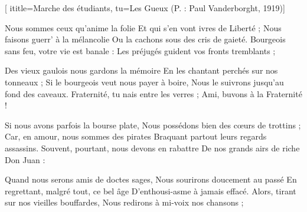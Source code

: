 [
  ititle={Marche des étudiants},
  tu={Les Gueux (P. : Paul Vanderborght, 1919)}]

  
\beginverse
Nous sommes ceux qu'anime la folie
Et qui s'en vont ivres de Liberté ;
Nous faisons guerr' à la mélancolie
Ou la cachons sous des cris de gaieté.
Bourgeois sans feu, votre vie est banale :
Les préjugés guident vos fronts tremblants ;
\endverse

\beginverse
Des vieux gaulois nous gardons la mémoire
En les chantant perchés sur nos tonneaux ;
Si le bourgeois veut nous payer à boire,
Nous le suivrons jusqu'au fond des caveaux.
Fraternité, tu nais entre les verres ;
Ami, buvons à la Fraternité !
\endverse

\beginverse
Si nous avons parfois la bourse plate,
Nous possédons bien des cœurs de trottins ;
Car, en amour, nous sommes des pirates
Braquant partout leurs regards assassins.
Souvent, pourtant, nous devons en rabattre
De nos grands airs de riche Don Juan :
\endverse

\beginverse
Quand nous serons amis de doctes sages,
Nous sourirons doucement au passé
En regrettant, malgré tout, ce bel âge
D'enthousi-asme à jamais effacé.
Alors, tirant sur nos vieilles bouffardes,
Nous redirons à mi-voix nos chansons ;
\endverse

\endsong
